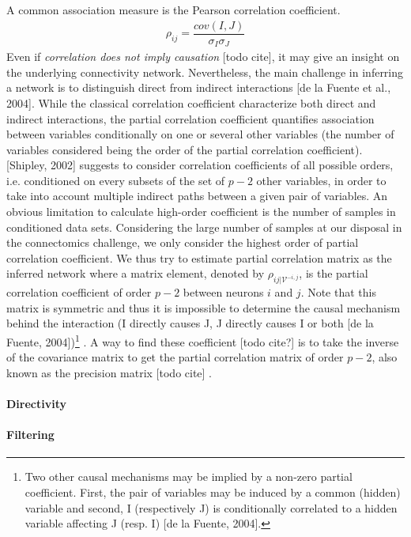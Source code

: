 \documentclass[wcp]{jmlr}
\begin{document}
A common association measure is the Pearson correlation coefficient.
\begin{align}
\rho_{ij} = \dfrac{cov(I,J)}{\sigma_I \sigma_J}
\end{align}
Even if \textit{correlation does not imply causation} [todo cite], it may give
an insight on the underlying connectivity network. Nevertheless, the main
challenge in inferring a network is to distinguish direct from indirect
interactions [de la Fuente et al., 2004]. While the classical correlation
coefficient characterize both direct and indirect interactions, the partial
correlation coefficient quantifies association between variables conditionally
on one or several other variables (the number of variables considered being
the order of the partial correlation coefficient). [Shipley, 2002] suggests to
consider correlation coefficients of all possible orders, i.e. conditioned
on every subsets of the set of $p-2$ other variables, in order to take into
account multiple indirect paths between a given pair of variables.  An obvious
limitation to calculate high-order coefficient is the number of samples in
conditioned data sets. Considering the large number of samples at our disposal
in the connectomics challenge, we only consider the highest order of partial
correlation coefficient. We thus try to estimate partial correlation matrix as
the inferred network where a matrix element, denoted by
$\rho_{ij | \mathcal{V}^{-i,j}}$, is the partial correlation coefficient of
order $p-2$ between neurons $i$ and $j$. Note that this matrix is symmetric
and thus it is impossible to determine the causal mechanism behind the
interaction (I directly causes J, J directly causes I or both
[de la Fuente, 2004])\footnote{Two other causal mechanisms may be implied
by a non-zero partial coefficient. First, the pair of variables may be induced
by a common (hidden) variable and second, I (respectively J) is conditionally
correlated to a hidden variable affecting J (resp. I) [de la Fuente, 2004].} .
A way to find these coefficient [todo cite?] is to take the inverse of the
covariance matrix to get the partial correlation matrix of order $p-2$, also
known as the precision matrix [todo cite] .

\paragraph{Directivity}

\paragraph{Filtering\\}
\end{document}
